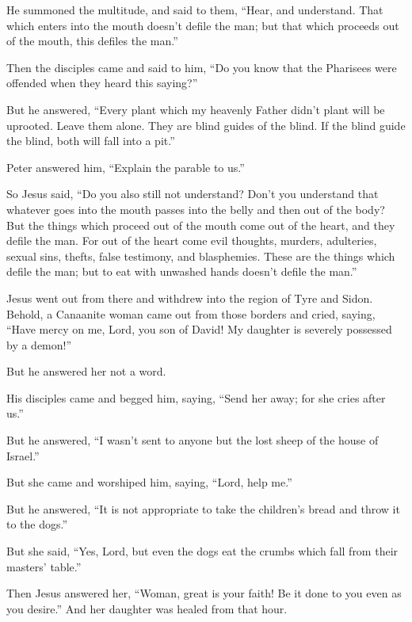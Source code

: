  He summoned the multitude, and said to them, ``Hear, and
understand.  That which enters into the mouth doesn't
defile the man; but that which proceeds out of the mouth, this defiles
the man.''

 Then the disciples came and said to him, ``Do you know
that the Pharisees were offended when they heard this saying?''

 But he answered, ``Every plant which my heavenly Father
didn't plant will be uprooted.  Leave them alone. They
are blind guides of the blind. If the blind guide the blind, both will
fall into a pit.''

 Peter answered him, ``Explain the parable to us.''

 So Jesus said, ``Do you also still not understand?
 Don't you understand that whatever goes into the mouth
passes into the belly and then out of the body?  But the
things which proceed out of the mouth come out of the heart, and they
defile the man.  For out of the heart come evil thoughts,
murders, adulteries, sexual sins, thefts, false testimony, and
blasphemies.  These are the things which defile the man;
but to eat with unwashed hands doesn't defile the man.''

 Jesus went out from there and withdrew into the region
of Tyre and Sidon.  Behold, a Canaanite woman came out
from those borders and cried, saying, ``Have mercy on me, Lord, you son
of David! My daughter is severely possessed by a demon!''

 But he answered her not a word.

His disciples came and begged him, saying, ``Send her away; for she
cries after us.''

 But he answered, ``I wasn't sent to anyone but the lost
sheep of the house of Israel.''

 But she came and worshiped him, saying, ``Lord, help
me.''

 But he answered, ``It is not appropriate to take the
children's bread and throw it to the dogs.''

 But she said, ``Yes, Lord, but even the dogs eat the
crumbs which fall from their masters' table.''

 Then Jesus answered her, ``Woman, great is your faith!
Be it done to you even as you desire.'' And her daughter was healed from
that hour.


